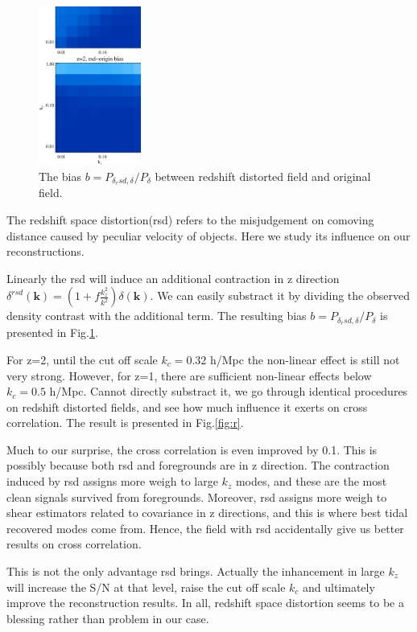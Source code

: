 \begin{figure}[tbp]
\begin{center}
\includegraphics[width=0.3\textwidth]{compare_bias_rsdsub_z1z2.eps}
\end{center}
\vspace{-0.7cm}
\caption{The bias $b=P_{\delta_rsd,\delta}/P_{\delta}$ 
between redshift distorted field and original field.}
\label{fig:bias}
\end{figure}
The redshift space distortion(rsd) refers to the misjudgement on comoving distance 
caused by peculiar velocity of objects. 
Here we study its influence on our reconstructions. 

Linearly the rsd will induce an additional contraction in z direction 
$\delta^{rsd}(\bm{k})=(1+f\frac{k_z^2}{k^2})\delta(\bm{k})$. 
We can easily substract it by dividing the observed density contrast with the additional term. 
The resulting bias $b=P_{\delta_rsd,\delta}/P_{\delta}$ is presented in 
Fig.\ref{fig:bias}. 

For z=2, until the cut off scale $k_c=0.32$ h/Mpc
the non-linear effect is still not very strong. 
However, for z=1, there are sufficient non-linear effects below $k_c=0.5$ h/Mpc. 
Cannot directly substract it, we go through identical procedures on redshift distorted fields, 
and see how much influence it exerts on cross correlation.
The result is presented in Fig.\ref{fig:r}. 

Much to our surprise, the cross correlation is even improved by 0.1. 
This is possibly because both rsd and foregrounds are in z direction. 
The contraction induced by rsd assigns more weigh to large $k_z$ modes, 
and these are the most clean signals survived from foregrounds.  
Moreover, rsd assigns more weigh to shear estimators related to covariance in z directions, 
and this is where best tidal recovered modes come from.  
Hence, the field with rsd accidentally give us better results on cross correlation.

This is not the only advantage rsd brings. 
Actually the inhancement in large $k_z$ will increase the S/N at that level, 
raise the cut off scale $k_c$ and ultimately improve the reconstruction results. 
In all, redshift space distortion seems to be a blessing rather than problem in our case. 
